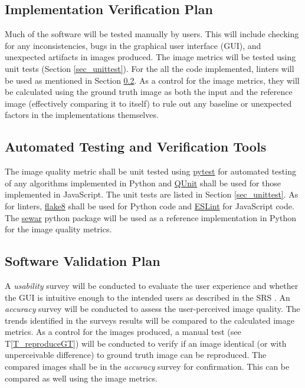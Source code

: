 \documentclass[12pt, titlepage]{article}
\newcommand{\tref}[1]{T\ref{#1}}
\begin{document}
\subsection{Implementation Verification Plan}  \label{sec_impl_vplan}

Much of the software will be tested manually by users. This will include checking for
any inconsistencies, bugs in the graphical user interface (GUI), and unexpected
artifacts in images produced.
The image metrics will be tested using unit tests (Section \ref{sec_unittest}). For the
all the code implemented, linters will be used as mentioned in Section \ref{sec_autotest_tools}.
As a control for the image metrics, they will be calculated using the ground truth image as both the 
input and the reference image (effectively comparing it to itself) 
to rule out any baseline or unexpected factors in the implementations themselves.


\subsection{Automated Testing and Verification Tools} \label{sec_autotest_tools}

The image quality metric shall be unit tested using \href{https://pytest.org}{pytest} for 
automated testing of any algorithms implemented in Python and \href{https://qunitjs.com}{QUnit} 
shall be used for those implemented in JavaScript. The unit tests are listed in 
Section \ref{sec_unittest}.
As for linters, \href{https://flake8.pycqa.org}{flake8} shall be used for Python code 
and \href{https://eslint.org}{ESLint} for JavaScript code.
The \href{https://github.com/andrewekhalel/sewar}{sewar} python package will be 
used as a reference implementation in Python for the image quality metrics.


\subsection{Software Validation Plan}
A \textit{usability} survey will be conducted to evaluate the user experience and whether 
the GUI is intuitive enough to the intended users as described in the SRS \citep{SRS}.
An \textit{accuracy} survey will be conducted to assess the user-perceived image quality. 
The trends identified in the surveys results will be compared to the calculated image metrics.
As a control for the images produced, a manual test (see \tref{T_reproduceGT})
will be conducted to verify if 
an image identical (or with unperceivable difference) to ground truth image can be reproduced.
The compared images shall be in the \textit{accuracy} survey for confirmation. This can be compared
as well using the image metrics. 
\end{document}
